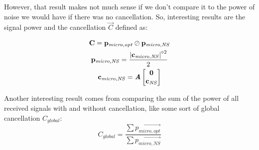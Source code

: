 However, that result makes not much sense if we don't compare it to the power of noise we would have if there was no cancellation. So, interesting results are the signal power and the cancellation $\vec{C}$ defined as:

\begin{gather}
\mathbf{C} = \mathbf{p_\mathit{micro,opt}} \oslash \mathbf{p_\mathit{micro,NS}} \\
\mathbf{p_\mathit{micro,NS}} = \frac{\left| \mathbf{c_{\mathit{micro,NS}}} \right|^{\circ 2}}{2}\\
\mathbf{c_{\mathit{micro,NS}}} = \bm{\mathit{A}} 
\begin{bmatrix}
	\mathbf{0} \\
	\mathbf{c_{\mathit{NS}}}
\end{bmatrix}
\end{gather}

Another interesting result comes from comparing the sum of the power of all received signals with and without cancellation, like some sort of global cancellation $C_\mathit{global}$:
\begin{equation}
C_\mathit{global} = \frac{\sum \vec{p_\mathit{micro,opt}}}{\sum \vec{p_\mathit{micro,NS}}} %
\label{globalCancEq}
\end{equation}





